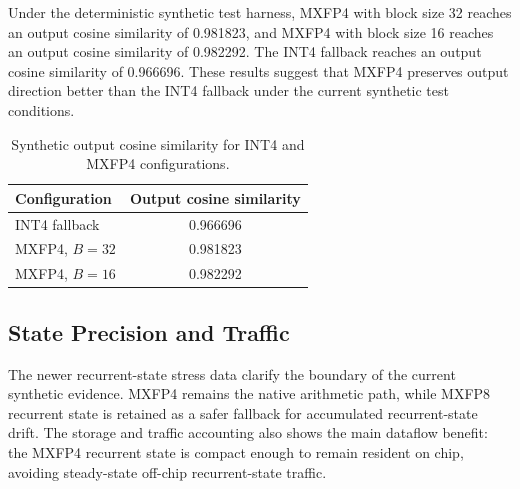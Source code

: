 \documentclass[conference]{IEEEtran}
\begin{document}
Under the deterministic synthetic test harness, MXFP4 with block size 32 reaches an output cosine similarity of 0.981823, and MXFP4 with block size 16 reaches an output cosine similarity of 0.982292. The INT4 fallback reaches an output cosine similarity of 0.966696. These results suggest that MXFP4 preserves output direction better than the INT4 fallback under the current synthetic test conditions.


\begin{table}[t]
\centering
\caption{Synthetic output cosine similarity for INT4 and MXFP4 configurations.}
\label{tab:accuracy_results}
\scriptsize
\setlength{\tabcolsep}{4pt}
\renewcommand{\arraystretch}{0.92}
\begin{tabular}{lc}
\hline
Configuration & Output cosine similarity \\
\hline
INT4 fallback & 0.966696 \\
MXFP4, $B=32$ & 0.981823 \\
MXFP4, $B=16$ & 0.982292 \\
\hline
\end{tabular}
\end{table}

\subsection{State Precision and Traffic}
The newer recurrent-state stress data clarify the boundary of the current synthetic evidence. MXFP4 remains the native arithmetic path, while MXFP8 recurrent state is retained as a safer fallback for accumulated recurrent-state drift. The storage and traffic accounting also shows the main dataflow benefit: the MXFP4 recurrent state is compact enough to remain resident on chip, avoiding steady-state off-chip recurrent-state traffic.

\begin{table}[t]
\centering
\caption{Synthetic recurrent-state stress evidence.}
\label{tab:state_stress_results}
\scriptsize
{}
\end{table}
\end{document}
